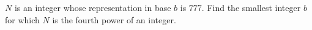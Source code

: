 $N$ is an integer whose representation in base $b$ is $777$.  Find the smallest integer $b$ for which $N$ is the fourth power of an integer.